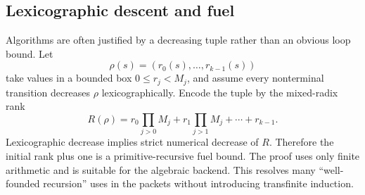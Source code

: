 \subsection{Lexicographic descent and fuel}
Algorithms are often justified by a decreasing tuple rather than an obvious loop bound.  Let
\[
 \rho(s)=(r_0(s),\ldots,r_{k-1}(s))
\]
take values in a bounded box \(0\le r_j<M_j\), and assume every nonterminal transition decreases \(\rho\) lexicographically.  Encode the tuple by the mixed-radix rank
\[
 R(\rho)=r_0\prod_{j>0}M_j+r_1\prod_{j>1}M_j+\cdots+r_{k-1}.
\]
Lexicographic decrease implies strict numerical decrease of \(R\).  Therefore the initial rank plus one is a primitive-recursive fuel bound.  The proof uses only finite arithmetic and is suitable for the algebraic backend.  This resolves many ``well-founded recursion'' uses in the packets without introducing transfinite induction.
